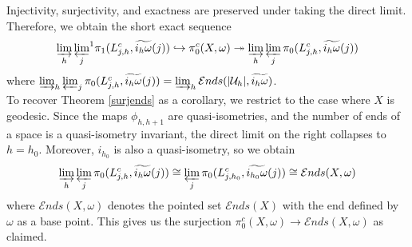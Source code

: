 \documentclass[a4paper,11pt]{article}
\theoremstyle{definition}
\theoremstyle{plain}
\theoremstyle{remark}
\begin{document}
{\begin{figure}[H]
\end{figure}

Injectivity, surjectivity, and exactness are preserved under taking the direct limit. Therefore, we obtain the short exact sequence 
\begin{align*}
  \varinjlim_{h} {\varprojlim_{j}}^{1} \pi_{1}(L_{j,h}^c,\widetilde{i_{h}\omega}(j))  \hookrightarrow  \pi_{0}^c(X,\omega) \twoheadrightarrow  \varinjlim_{h} \varprojlim_{j} \pi_{0}(L_{j,h}^c,\widetilde{i_{h}\omega}(j)) 
\end{align*}
where $\varinjlim_{h}\varprojlim_{j} \pi_{0}(L_{j,h}^c,\widetilde{i_{h}\omega}(j)) = \varinjlim_{h}\mathcal{E}nds(|\mathcal{U}_{h}|, \widetilde{i_{h}\omega})$. \\

To recover Theorem \ref{surjends} as a corollary, we restrict to the case where $X$ is geodesic.  Since the maps $\phi_{h,h+1}$ are quasi-isometries, and the number of ends of a space is a quasi-isometry invariant, the direct limit on the right collapses to $h=h_{0}$. Moreover, $i_{h_{0}}$ is also a quasi-isometry, so we obtain 
\begin{align*}
 \varinjlim_{h} \varprojlim_{j} \pi_{0}(L_{j,h}^c,\widetilde{i_{h}\omega}(j)) \cong \varprojlim_{j} \pi_{0}(L_{j,h_{0}}^c,\widetilde{i_{h_{0}}\omega}(j)) \cong \mathcal{E}nds(X,\omega)
\end{align*}
where $\mathcal{E}nds(X,\omega)$ denotes the pointed set $\mathcal{E}nds(X)$ with the end defined by $\omega$ as a base point.  This gives us the surjection $ \pi_{0}^c(X,\omega)\rightarrow \mathcal{E}nds(X,\omega)$ as claimed.\\

}
\end{document}
